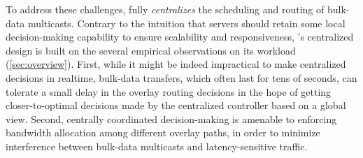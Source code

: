 %

To address these challenges, \name fully {\em centralizes}
the scheduling and routing of bulk-data multicasts.
Contrary to the intuition that servers should retain some
local decision-making capability to ensure scalability and 
responsiveness, \name's centralized design
is built on the several empirical observations on its workload
(\Section\ref{sec:overview}).
First, while it might be indeed impractical to make 
centralized decisions in realtime, bulk-data transfers, which 
often last for tens of seconds, 
can tolerate a small delay in the overlay routing decisions 
in the hope of getting closer-to-optimal decisions made by
the centralized controller based on a global view.
Second, centrally coordinated decision-making is amenable
to enforcing bandwidth allocation among different overlay paths,
in order to minimize interference between bulk-data
multicasts and latency-sensitive traffic.

